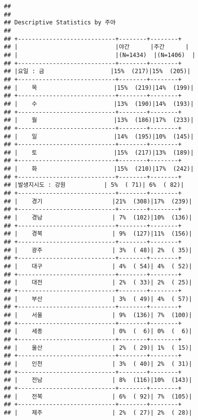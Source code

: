 \documentclass[]{article}
\begin{document}
\begin{verbatim}
## 
## 
## Descriptive Statistics by 주야
## 
## +----------------------------+--------+--------+
## |                            |야간      |주간      |
## |                            |(N=1434)  |(N=1406)  |
## +----------------------------+--------+--------+
## |요일 : 금                   |15%  (217)|15%  (205)|
## +----------------------------+--------+--------+
## |    목                      |15%  (219)|14%  (199)|
## +----------------------------+--------+--------+
## |    수                      |13%  (190)|14%  (193)|
## +----------------------------+--------+--------+
## |    월                      |13%  (186)|17%  (233)|
## +----------------------------+--------+--------+
## |    일                      |14%  (195)|10%  (145)|
## +----------------------------+--------+--------+
## |    토                      |15%  (217)|13%  (189)|
## +----------------------------+--------+--------+
## |    화                      |15%  (210)|17%  (242)|
## +----------------------------+--------+--------+
## |발생지시도 : 강원           | 5%  ( 71)| 6%  ( 82)|
## +----------------------------+--------+--------+
## |    경기                    |21%  (308)|17%  (239)|
## +----------------------------+--------+--------+
## |    경남                    | 7%  (102)|10%  (136)|
## +----------------------------+--------+--------+
## |    경북                    | 9%  (127)|11%  (156)|
## +----------------------------+--------+--------+
## |    광주                    | 3%  ( 48)| 2%  ( 35)|
## +----------------------------+--------+--------+
## |    대구                    | 4%  ( 54)| 4%  ( 52)|
## +----------------------------+--------+--------+
## |    대전                    | 2%  ( 33)| 2%  ( 25)|
## +----------------------------+--------+--------+
## |    부산                    | 3%  ( 49)| 4%  ( 57)|
## +----------------------------+--------+--------+
## |    서울                    | 9%  (136)| 7%  (100)|
## +----------------------------+--------+--------+
## |    세종                    | 0%  (  6)| 0%  (  6)|
## +----------------------------+--------+--------+
## |    울산                    | 2%  ( 29)| 1%  ( 15)|
## +----------------------------+--------+--------+
## |    인천                    | 3%  ( 40)| 2%  ( 31)|
## +----------------------------+--------+--------+
## |    전남                    | 8%  (116)|10%  (143)|
## +----------------------------+--------+--------+
## |    전북                    | 6%  ( 92)| 7%  (105)|
## +----------------------------+--------+--------+
## |    제주                    | 2%  ( 27)| 2%  ( 28)|

\end{verbatim}
\end{document}
